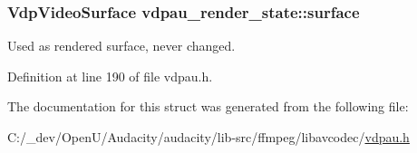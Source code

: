 \subsubsection[{\texorpdfstring{surface}{surface}}]{\setlength{\rightskip}{0pt plus 5cm}Vdp\+Video\+Surface vdpau\+\_\+render\+\_\+state\+::surface}\hypertarget{structvdpau__render__state_a03db4a28b9c8187ca69335d6aaa01d3f}{}\label{structvdpau__render__state_a03db4a28b9c8187ca69335d6aaa01d3f}


Used as rendered surface, never changed. 



Definition at line 190 of file vdpau.\+h.



The documentation for this struct was generated from the following file\+:\begin{DoxyCompactItemize}
\item 
C\+:/\+\_\+dev/\+Open\+U/\+Audacity/audacity/lib-\/src/ffmpeg/libavcodec/\hyperlink{vdpau_8h}{vdpau.\+h}\end{DoxyCompactItemize}
